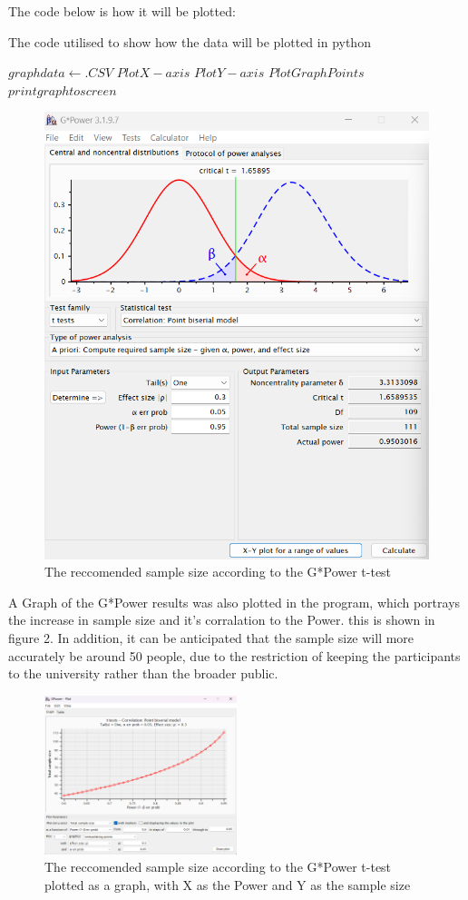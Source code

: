 \documentclass[conference]{IEEEtran}
\begin{document}
The code below is how it will be plotted:
\begin{algorithm}
\caption{The code utilised to show how the data will be plotted in python}
\begin{algorithmic}
\STATE $ graph data \gets .CSV $
	\STATE $Plot X-axis$
	\STATE $Plot Y-axis$
	\STATE $Plot Graph Points$
\ENDFOR
\STATE $print graph to screen$
\end{algorithmic}
\end{algorithm}

\begin{figure}[H]
\includegraphics[width =0.5 \textwidth]{fig1(2)}
\caption{The reccomended sample size according to the G*Power t-test}
\end{figure}

A Graph of the G*Power results was also plotted in the program, which portrays the increase in sample size and it's corralation to the Power. this is shown in figure 2. In addition, it can be anticipated that the sample size will more accurately be around 50 people, due to the restriction of keeping the participants to the university rather than the broader public. 

\begin{figure}[H]
\includegraphics[width = 0.5\textwidth]{fig2(2)}
\caption{The reccomended sample size according to the G*Power t-test plotted as a graph, with X as the Power and Y as the sample size}
\end{figure}
\end{document}
